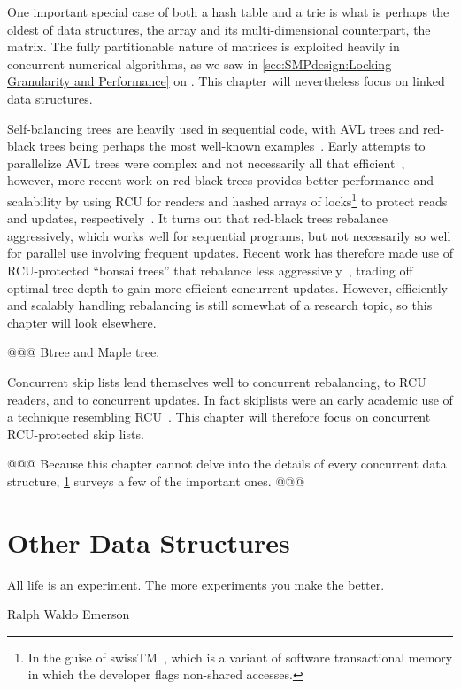 One important special case of both a hash table and a trie is what is
perhaps the oldest of data structures, the array and its multi-dimensional
counterpart, the matrix.
The fully partitionable nature of matrices is exploited heavily in
concurrent numerical algorithms, as we saw in
\cref{sec:SMPdesign:Locking Granularity and Performance}
on
.
This chapter will nevertheless focus on linked data structures.

Self-balancing trees are heavily used in sequential code, with
AVL trees and red-black trees being perhaps the most well-known
examples~\cite{ThomasHCorman2001Algorithms}.
Early attempts to parallelize AVL trees were complex and not necessarily
all that efficient~\cite{Ellis80},
however, more recent work on red-black trees provides better
performance and scalability by using RCU for readers and hashed arrays
of locks\footnote{
	In the guise of swissTM~\cite{AleksandarDragovejic2011STMnotToy},
	which is a variant of software transactional memory in which
	the developer flags non-shared accesses.}
to protect reads and updates,
respectively~\cite{PhilHoward2011RCUTMRBTree,PhilipWHoward2013RCUrbtree}.
It turns out that red-black trees rebalance aggressively, which works
well for sequential programs, but not necessarily so well for parallel
use involving frequent updates.
Recent work has therefore made use of RCU-protected ``bonsai trees''
that rebalance less aggressively~\cite{AustinClements2012RCULinux:mmapsem},
trading off optimal tree depth to gain more efficient concurrent updates.
However, efficiently and scalably handling rebalancing is still somewhat
of a research topic, so this chapter will look elsewhere.

@@@ Btree and Maple tree.

Concurrent skip lists lend themselves well to concurrent rebalancing,
to RCU readers, and to concurrent updates.
In fact skiplists were an early academic use of a technique resembling
RCU~\cite{Pugh90}.
This chapter will therefore focus on concurrent RCU-protected skip lists.

@@@
Because this chapter cannot delve into the details of every concurrent
data structure,
\cref{sec:skiplist:Other Data Structures}
surveys a few of the important ones.
@@@

\section{Other Data Structures}
\label{sec:skiplist:Other Data Structures}
%
\epigraph{All life is an experiment.
	  The more experiments you make the better.}
	 {Ralph Waldo Emerson}

